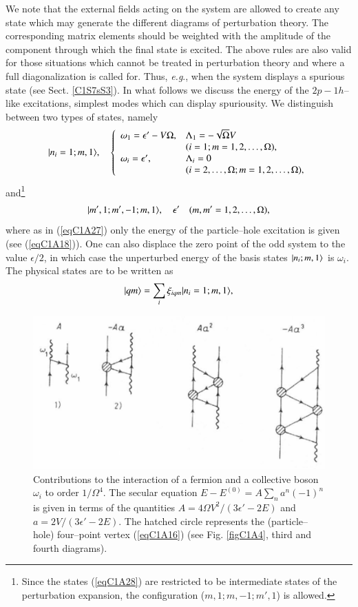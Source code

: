 We note that the external fields acting on the system are allowed to create
any state which may generate the different diagrams of perturbation theory.
The corresponding matrix elements should be weighted with the amplitude of
the component through which the final state is excited.
The above rules are also valid for those situations which cannot be treated
in perturbation theory and where a full diagonalization is called for. Thus,
\textit{e.g}., when the system displays a spurious state (see Sect. \ref{C1S7sS3}).
In what follows we discuss the energy of the $2p-1h$--like excitations, simplest modes which can display spuriousity. We
distinguish between two types of states, namely
 \begin{align}\label{eqC1A27} 
|{n_i=1;m,1} \rangle,\quad\left\{
\begin{array}{ll}
\omega_1=\epsilon'-V\Omega, &\Lambda_1=-\sqrt{\Omega}V\\
&(i=1;m=1,2,\dots,\Omega),  \\ 
\omega_i=\epsilon', &\Lambda_i=0\\
&(i=2,\dots,\Omega; m=1,2,\dots,\Omega),
\end{array} \right. 
 \end{align}
and\footnote{Since the states (\ref{eqC1A28}) are restricted to be intermediate states of the perturbation
expansion, the configuration ($m,1;m,-1;m',1$) is allowed.}
 \begin{align}\label{eqC1A28} 
|{m',1;m',-1;m,1} \rangle,\quad\epsilon'\quad(m,m'=1,2,\dots,\Omega),
 \end{align}
 where as in (\ref{eqC1A27}) only the energy of the particle--hole excitation is given (see (\ref{eqC1A18})). One can also displace the zero point of the odd system to the value $\epsilon/2$, in which case the unperturbed energy of the basis states $|{n_i;m,1} \rangle$ is $\omega_i$.
The physical states are to be written as
 \begin{align}\label{eqC1A29} 
|{qm} \rangle=\sum_i\xi_{iqm}|{n_i=1;m,1} \rangle,
 \end{align}
  \begin{figure}
  \centerline {
  \includegraphics*[width=12cm]{introduccion/figs/fig19}
  }
  \caption{Contributions to the interaction of a fermion and a collective boson $\omega_i$ to order $1/\Omega^4$. The secular equation $E-E^{(0)}=A\sum_na^n(-1)^n$ is given in terms of the quantities $A=4\Omega V^2/(3\epsilon'-2E)$ and $a=2V/(3\epsilon'-2E)$. The hatched circle represents the (particle--hole) four--point vertex (\ref{eqC1A16}) (see Fig. \ref{figC1A4}, third and fourth diagrams).}
  \label{figC1A2}
  \end{figure}
